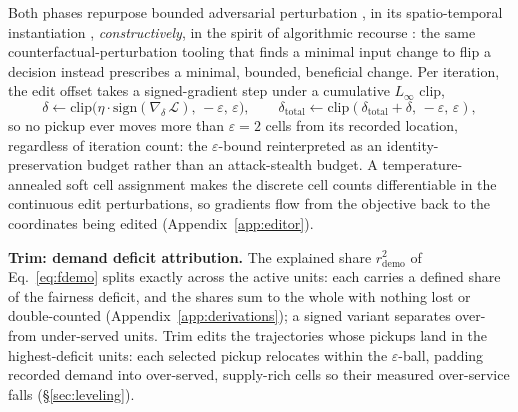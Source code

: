 Both phases repurpose bounded adversarial
perturbation \cite{goodfellow2015fgsm,kurakin2017ifgsm}, in its
spatio-temporal instantiation \cite{hu2023stifgsm}, \emph{constructively},
in the spirit of algorithmic recourse
\cite{ustun2019recourse,wachter2018counterfactual}: the same
coun\-ter\-fac\-tual-perturbation tooling that finds a minimal input change to flip
a decision instead prescribes a minimal, bounded, beneficial change. Per
iteration, the edit offset takes a signed-gradient step under a cumulative
$L_\infty$ clip,
\begin{equation}\label{eq:step}
\delta \leftarrow \mathrm{clip}\bigl(\eta \cdot
\mathrm{sign}(\nabla_{\delta}\,\mathcal{L}),\, -\varepsilon,\, \varepsilon\bigr),
\qquad
\delta_{\mathrm{total}} \leftarrow
\mathrm{clip}(\delta_{\mathrm{total}} + \delta,\, -\varepsilon,\, \varepsilon),
\end{equation}
so no pickup ever moves more than $\varepsilon = 2$ cells from its recorded
location, regardless of iteration count: the $\varepsilon$-bound
reinterpreted as an identity-preservation budget rather than an attack-stealth
budget. A temperature-annealed soft cell assignment makes the discrete
cell counts differentiable in the continuous edit perturbations, so gradients
flow from the objective back to the coordinates being edited
(Appendix~\ref{app:editor}).

\textbf{Trim: demand deficit attribution.} The explained share
$r^{2}_{\mathrm{demo}}$ of Eq.~\eqref{eq:fdemo} splits exactly across the
active units: each carries a defined share of the
fairness deficit, and the shares sum to the whole with nothing lost or
double-counted (Appendix~\ref{app:derivations}); a signed variant
separates over- from under-served units.
Trim edits the
trajectories whose pickups land in the highest-deficit units: each selected
pickup relocates within the $\varepsilon$-ball, padding recorded demand into
over-served, supply-rich cells so their measured over-service falls
(\S\ref{sec:leveling}).


